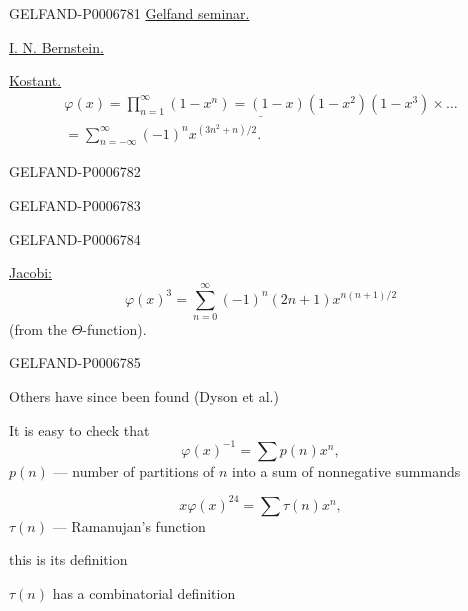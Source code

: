 \begin{GelfandAdjacentEvidence}{GELFAND-P000678}{1}
\underline{Gelfand seminar.}

\underline{I. N. Bernstein.}

\underline{Kostant.}
\[
\begin{aligned}
\underline{\varphi(x)=\prod_{n=1}^{\infty}(1-x^n)
   =(1-x)(1-x^2)(1-x^3)\times\ldots}\\
=\sum_{n=-\infty}^{\infty}(-1)^n x^{(3n^2+n)/2}.
\end{aligned}
\]
\end{GelfandAdjacentEvidence}
\begin{GelfandAdjacentEvidence}{GELFAND-P000678}{2}

\end{GelfandAdjacentEvidence}
\begin{GelfandAdjacentEvidence}{GELFAND-P000678}{3}

\end{GelfandAdjacentEvidence}
\begin{GelfandAdjacentEvidence}{GELFAND-P000678}{4}


\underline{Jacobi:}
\[
\varphi(x)^3=\sum_{n=0}^{\infty}(-1)^n(2n+1)x^{n(n+1)/2}
\]
(from the \(\Theta\)-function).
\end{GelfandAdjacentEvidence}
\begin{GelfandAdjacentEvidence}{GELFAND-P000678}{5}


Others have since been found (Dyson et al.)


It is easy to check that
\[
\varphi(x)^{-1}=\sum p(n)x^n,
\]
\(p(n)\) --- number of partitions of \(n\) into a sum of nonnegative summands

\[
x\varphi(x)^{24}=\sum\tau(n)x^n,
\]
\(\tau(n)\) --- Ramanujan’s function

this is its definition

\(\tau(n)\) has a combinatorial definition

\end{GelfandAdjacentEvidence}
